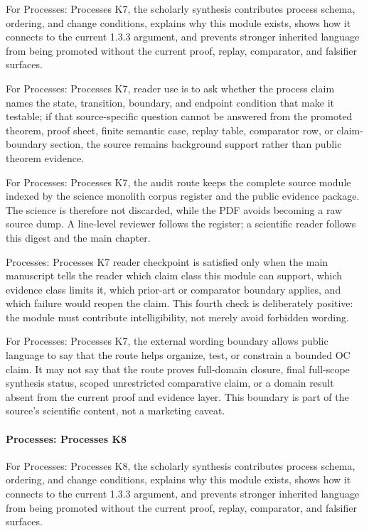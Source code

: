 For Processes: Processes K7, the scholarly synthesis contributes process schema, ordering, and change conditions, explains why this module exists, shows how it connects to the current 1.3.3 argument, and prevents stronger inherited language from being promoted without the current proof, replay, comparator, and falsifier surfaces.


For Processes: Processes K7, reader use is to ask whether the process claim names the state, transition, boundary, and endpoint condition that make it testable; if that source-specific question cannot be answered from the promoted theorem, proof sheet, finite semantic case, replay table, comparator row, or claim-boundary section, the source remains background support rather than public theorem evidence.


For Processes: Processes K7, the audit route keeps the complete source module indexed by the science monolith corpus register and the public evidence package. The science is therefore not discarded, while the PDF avoids becoming a raw source dump. A line-level reviewer follows the register; a scientific reader follows this digest and the main chapter.


Processes: Processes K7 reader checkpoint is satisfied only when the main manuscript tells the reader which claim class this module can support, which evidence class limits it, which prior-art or comparator boundary applies, and which failure would reopen the claim. This fourth check is deliberately positive: the module must contribute intelligibility, not merely avoid forbidden wording.


For Processes: Processes K7, the external wording boundary allows public language to say that the route helps organize, test, or constrain a bounded OC claim. It may not say that the route proves full-domain closure, final full-scope synthesis status, scoped unrestricted comparative claim, or a domain result absent from the current proof and evidence layer. This boundary is part of the source's scientific content, not a marketing caveat.


\paragraph{Processes: Processes K8}

For Processes: Processes K8, the scholarly synthesis contributes process schema, ordering, and change conditions, explains why this module exists, shows how it connects to the current 1.3.3 argument, and prevents stronger inherited language from being promoted without the current proof, replay, comparator, and falsifier surfaces.


